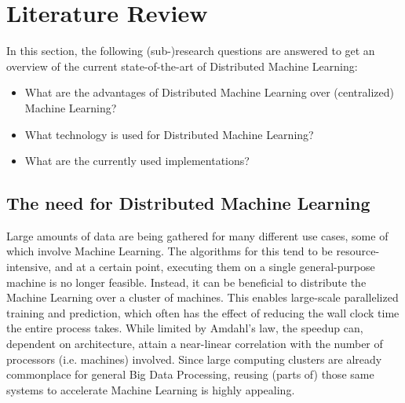 \section{Literature Review}
In this section, the following (sub-)research questions are answered to get an overview of the current state-of-the-art of Distributed Machine Learning:
\begin{itemize}
	\item What are the advantages of Distributed Machine Learning over (centralized) Machine Learning?
	\item What technology is used for Distributed Machine Learning?
	\item What are the currently used implementations?
\end{itemize}

\subsection{The need for Distributed Machine Learning}
Large amounts of data are being gathered for many different use cases, some of which involve Machine Learning. The algorithms for this tend to be resource-intensive, and at a certain point, executing them on a single general-purpose machine is no longer feasible.
Instead, it can be beneficial to distribute the Machine Learning over a cluster of machines. This enables large-scale parallelized training and prediction, which often has the effect of reducing the wall clock time the entire process takes. While limited by Amdahl's law\cite{hill2008amdahl}, the speedup can, dependent on architecture, attain a near-linear correlation with the number of processors (i.e. machines) involved. Since large computing clusters are already commonplace for general Big Data Processing, reusing (parts of) those same systems to accelerate Machine Learning is highly appealing.





